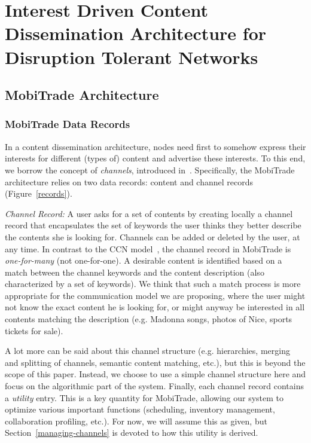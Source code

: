 \chapter{Interest Driven Content Dissemination Architecture for Disruption Tolerant Networks}
\label{chapter:PTMP}
\minitoc
\section{MobiTrade Architecture}
\label{MobiTrade-architecture}
\subsection{MobiTrade Data Records}
\label{content-channel-records}

In a content dissemination architecture, nodes need first to somehow express their interests for different (types of) content and advertise these interests. To this end, we borrow the concept of \emph{channels}, introduced in~\cite{May07wirelessopportunistic}. Specifically, the MobiTrade architecture relies on two data records: content and channel records (Figure~\ref{records}).

\emph{Channel Record:} A user asks for a set of contents by creating locally a channel record that encapsulates the set of keywords the user thinks they better describe the contents she is looking for. Channels can be added or deleted by the user, at any time. In contrast to the CCN model~\cite{CCN}, the channel record in MobiTrade is \emph{one-for-many} (not one-for-one). A desirable content is identified based on a match between the channel keywords and the content description (also characterized by a set of keywords). We think that such a match process is more appropriate for the communication model we are proposing, where the user might not know the exact content he is looking for, or might anyway be interested in all contents matching the description (e.g. Madonna songs, photos of Nice, sports tickets for sale). 

A lot more can be said about this channel structure (e.g. hierarchies, merging and splitting of channels, semantic content matching, etc.), but this is beyond the scope of this paper. Instead, we choose to use a simple channel structure here and focus on the algorithmic part of the system. Finally, each channel record contains a \emph{utility} entry. This is a key quantity for MobiTrade, allowing our system to optimize various important functions (scheduling, inventory management, collaboration profiling, etc.). For now, we will assume this as given, but Section~\ref{managing-channels} is devoted to how this utility is derived.

